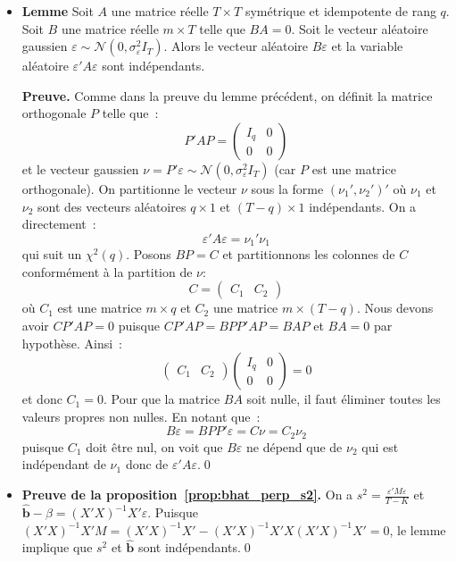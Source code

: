 \documentclass[10pt]{beamer}
\begin{document}
\begin{notes}

  \begin{itemize}

  \item \textbf{Lemme}
    Soit $A$ une matrice réelle $T\times T$ symétrique et idempotente de rang $q$. Soit $B$ une matrice réelle $m\times T$ telle que $BA=0$. Soit le vecteur aléatoire gaussien $\varepsilon\sim\mathcal N(0, \sigma_{\varepsilon}^2I_T)$. Alors le vecteur aléatoire $B\varepsilon$ et la variable aléatoire $\varepsilon' A \varepsilon$ sont indépendants.\newline

    \textbf{Preuve.} Comme dans la preuve du lemme précédent, on définit la matrice orthogonale $P$ telle que~:
    \[
      P'AP =
      \begin{pmatrix}
        I_q & 0\\
        0   & 0
      \end{pmatrix}
    \]
    et le vecteur gaussien $\nu = P'\varepsilon\sim\mathcal N\left(0, \sigma_{\varepsilon}^2I_T\right)$ (car $P$ est une matrice orthogonale). On partitionne le vecteur $\nu$ sous la forme $(\nu_1',\nu_2')'$ où $\nu_1$ et $\nu_2$ sont des vecteurs aléatoires $q\times 1$ et $(T-q)\times 1$ indépendants. On a directement~:
    \[
      \varepsilon' A \varepsilon = \nu_1'\nu_1
    \]
    qui suit un $\chi^2(q)$. Posons $BP = C$ et partitionnons les colonnes de $C$ conformément à la partition de $\nu$:
    \[
      C =
      \begin{pmatrix}
        C_1 & C_2
      \end{pmatrix}
    \]
    où $C_1$ est une matrice $m\times q$ et $C_2$ une matrice $m\times(T-q)$. Nous devons avoir $C P' A P = 0$ puisque $CP'AP = BPP'AP = BAP$ et $BA = 0$ par hypothèse. Ainsi~:
    \[
      \begin{pmatrix}
        C_1 & C_2
      \end{pmatrix}
      \begin{pmatrix}
        I_q & 0\\
        0   & 0
      \end{pmatrix}
      = 0
    \]
    et donc $C_1=0$. Pour que la matrice $BA$ soit nulle, il faut éliminer toutes les valeurs propres non nulles. En notant que~:
    \[
      B\varepsilon = BPP'\varepsilon = C\nu = C_2\nu_2
    \]
    puisque $C_1$ doit être nul, on voit que $B\varepsilon$ ne dépend que de $\nu_2$ qui est indépendant de $\nu_1$ donc de $\varepsilon' A \varepsilon$.\qed\newline

  \item \textbf{Preuve de la proposition~\ref{prop:bhat_perp_s2}.} On
    a $s^2=\frac{\varepsilon' M \varepsilon}{T-K}$
    et
    $\hat{\mathbf b}-\beta = (X'X)^{-1}X'\varepsilon$. Puisque
    $(X'X)^{-1}X'M = (X'X)^{-1}X'-(X'X)^{-1}X'X(X'X)^{-1}X'=0$, le
    lemme implique que $s^2$ et $\hat{\mathbf b}$ sont indépendants.\qed


  \end{itemize}

\end{notes}
\end{document}
